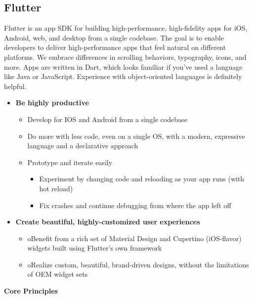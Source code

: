 \subsection{Flutter}
\hspace{2cm} Flutter is an app SDK for building high-performance, high-fidelity apps for iOS, Android, web, and desktop from a single codebase.
The goal is to enable developers to deliver high-performance apps that feel natural on different platforms. We embrace differences in scrolling behaviors, typography, icons, and more.
Apps are written in Dart, which looks familiar if you’ve used a language like Java or JavaScript. Experience with object-oriented languages is definitely helpful.
\newline
{}
\begin{itemize}
  \item {\textbf{Be highly productive}}
  \begin{itemize}
  \item Develop for IOS and Android from a single codebase
  \item Do more with less code, even on a single OS, with a modern, expressive language and a declarative approach
  \item Prototype and iterate easily
    \begin{itemize}
        \item Experiment by changing code and reloading as your app runs (with hot reload)
        \item Fix crashes and continue debugging from where the app left off
    \end{itemize}
  \end{itemize}
  \item {\textbf{Create beautiful, highly-customized user experiences}}
   \begin{itemize}
  \item oBenefit from a rich set of Material Design and Cupertino (iOS-flavor) widgets built using Flutter’s own framework
  \item oRealize custom, beautiful, brand-driven designs, without the limitations of OEM widget sets
  \end{itemize}
\end{itemize}
\textbf{Core Principles}
